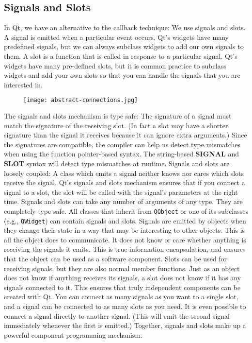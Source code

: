\subsection{Signals and Slots}
\label{ssec:soft-sig-solt-detail}
In Qt, we have an alternative to the callback technique: We use signals and
slots. A signal is emitted when a particular event occurs. Qt's widgets have
many predefined signals, but we can always subclass widgets to add our own
signals to them. A slot is a function that is called in response to a particular
signal. Qt's widgets have many pre-defined slots, but it is common practice to
subclass widgets and add your own slots so that you can handle the signals that
you are interested in.\hfill \break
%
%
\begin{figure}[htb]
	\centering
	\texttt{[image: abstract-connections.jpg]}
	\label{fig:software-signal-slots-scheme}
\end{figure}
%
\newline The signals and slots mechanism is type safe: The signature of a signal must
match the signature of the receiving slot. (In fact a slot may have a shorter
signature than the signal it receives because it can ignore extra arguments.)
Since the signatures are compatible, the compiler can help us detect type
mismatches when using the function pointer-based syntax. The string-based
\textbf{SIGNAL} and \textbf{SLOT} syntax will detect type mismatches at runtime.
Signals and slots are loosely coupled: A class which emits a signal neither
knows nor cares which slots receive the signal. Qt's signals and slots mechanism
ensures that if you connect a signal to a slot, the slot will be called with the
signal's parameters at the right time. Signals and slots can take any number of
arguments of any type. They are completely type safe.
%
All classes that inherit from \texttt{QObject} or one of its subclasses (e.g.,
\texttt{QWidget}) can contain signals and slots. Signals are emitted by objects
when they change their state in a way that may be interesting to other objects.
This is all the object does to communicate. It does not know or care whether
anything is receiving the signals it emits. This is true information
encapsulation, and ensures that the object can be used as a software component.
%
Slots can be used for receiving signals, but they are also normal member
functions. Just as an object does not know if anything receives its signals, a
slot does not know if it has any signals connected to it. This ensures that
truly independent components can be created with Qt.
%
You can connect as many signals as you want to a single slot, and a signal can
be connected to as many slots as you need. It is even possible to connect a
signal directly to another signal. (This will emit the second signal immediately
whenever the first is emitted.)
%
Together, signals and slots make up a powerful component programming mechanism.\cite{Qt:signal-slot}

